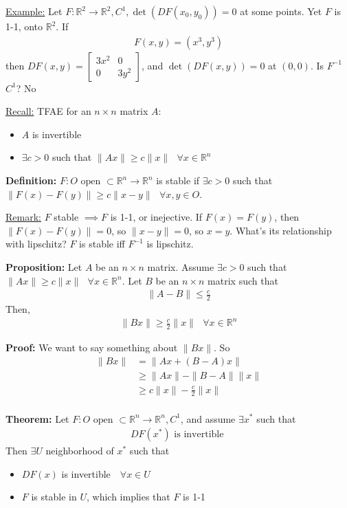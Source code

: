 \documentclass{article}
\newcommand*{\txt}[1]{\text{ #1 }}%
\newcommand*{\fora}{\txt{}\forall}%
\newcommand*{\rr}{\mathbb{R}}%
\begin{document}
\underline{Example:} Let $F:\rr^2\to \rr^2, C^1, \det(DF(x_0,y_0))=0$ at some points. Yet $F$ is 1-1, onto $\rr^2$. If \begin{align*}
    F(x,y)=(x^3,y^3)
\end{align*} then $DF(x,y)=\begin{bmatrix}
    3x^2 & 0\\
    0 & 3y^2
\end{bmatrix}$, and $\det(DF(x,y))=0$ at $(0,0)$. Is $F^{-1}$ $C^1$? No

\underline{Recall:} TFAE for an $n\times n$ matrix $A$:\begin{itemize}
    \item $A$ is invertible
    \item $\exists c>0$ such that $\|Ax\|\geq c\|x\|\fora x\in \rr^n$
\end{itemize}

\textbf{Definition:} $F:O\txt{open}\subset \rr^n\to \rr^n$ is stable if $\exists c>0$ such that $\|F(x)-F(y)\|\geq c\|x-y\|\fora x,y\in O$.

\underline{Remark:} $F$ stable $\implies F$ is 1-1, or inejective. If $F(x)=F(y)$, then $\|F(x)-F(y)\|=0$, so $\|x-y\|=0$, so $x=y$. What's its relationship with lipschitz? $F$ is stable iff $F^{-1}$ is lipschitz.

\textbf{Proposition:} Let $A$ be an $n\times n$ matrix. Assume $\exists c>0$ such that $\|Ax\|\geq c\|x\|\fora x\in \rr^n$. Let $B$ be an $n\times n$ matrix such that \begin{align*}
    \|A-B\|\leq \frac{c}{2}
\end{align*} Then, \begin{align*}
    \|Bx\|\geq \frac{c}{2}\|x\|\fora x\in \rr^n
\end{align*}

\textbf{Proof:} We want to say something about $\|Bx\|$. So \begin{align*}
    \|Bx\|&=\|Ax+(B-A)x\|\\
    &\geq \|Ax\|-\|B-A\|\|x\|\\
    &\geq c\|x\|-\frac{c}{2}\|x\|\\
\end{align*}

\textbf{Theorem:} Let $F:O\txt{open}\subset\rr^n\to \rr^n, C^1$, and assume $\exists x^{*}$ such that \begin{align*}
    DF(x^{*})\txt{is invertible}
\end{align*}Then $\exists U$ neighborhood of $x^{*}$ such that \begin{itemize}
    \item $DF(x)$ is invertible $\fora x\in U$
    \item $F$ is stable in $U$, which implies that $F$ is 1-1
\end{itemize}
\end{document}
